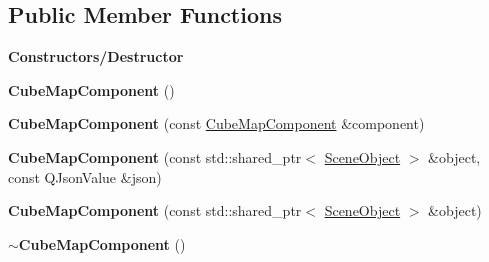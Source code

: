 \subsection*{Public Member Functions}
\begin{Indent}\textbf{ Constructors/\+Destructor}\par
\begin{DoxyCompactItemize}
\item 
\mbox{\label{classrev_1_1_cube_map_component_a3280f5294ae1925876b1fc6ea898767b}} 
{\bfseries Cube\+Map\+Component} ()
\item 
\mbox{\label{classrev_1_1_cube_map_component_aa1f0233043f6892e8d4ba9091bc16d81}} 
{\bfseries Cube\+Map\+Component} (const \mbox{\hyperlink{classrev_1_1_cube_map_component}{Cube\+Map\+Component}} \&component)
\item 
\mbox{\label{classrev_1_1_cube_map_component_a35910960d32eef622a763d3cc8b80fc1}} 
{\bfseries Cube\+Map\+Component} (const std\+::shared\+\_\+ptr$<$ \mbox{\hyperlink{classrev_1_1_scene_object}{Scene\+Object}} $>$ \&object, const Q\+Json\+Value \&json)
\item 
\mbox{\label{classrev_1_1_cube_map_component_a28459894aef35a4b2bd134a420fb074b}} 
{\bfseries Cube\+Map\+Component} (const std\+::shared\+\_\+ptr$<$ \mbox{\hyperlink{classrev_1_1_scene_object}{Scene\+Object}} $>$ \&object)
\item 
\mbox{\label{classrev_1_1_cube_map_component_a9b5ebcce520ac7aa9573caab2af05f10}} 
{\bfseries $\sim$\+Cube\+Map\+Component} ()
\end{DoxyCompactItemize}
\end{Indent}
